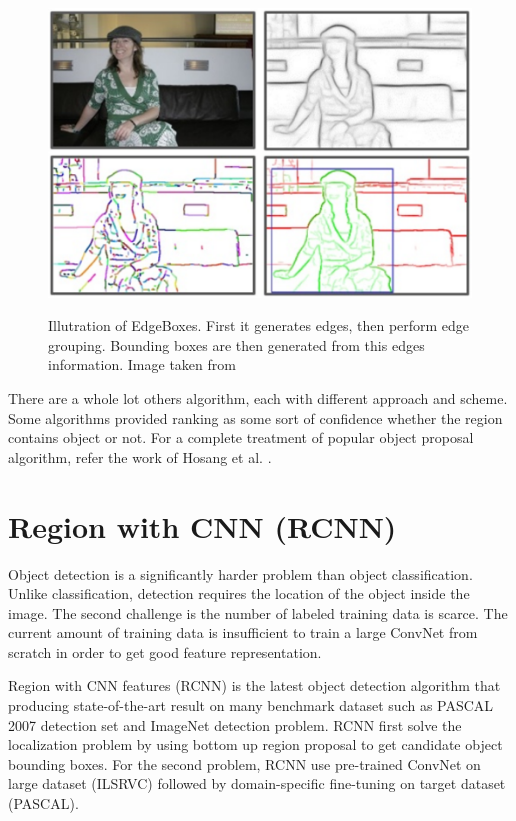 \documentclass[a4paper,11pt]{kth-mag}
\begin{document}
\begin{figure}[h]
\centering
\includegraphics[scale=0.5]{image/edgeboxes.png}
\label{fig:edgeboxes}
\caption{Illutration of EdgeBoxes. First it generates edges, then perform edge grouping. Bounding boxes are then generated from this edges information. Image taken from \cite{zitnick2014edgeboxes}}
\end{figure}

There are a whole lot others algorithm, each with different approach and scheme. Some algorithms provided ranking as some sort of confidence whether the region contains object or not. For a complete treatment of popular object proposal algorithm, refer the work of Hosang et al. \cite{hosang}.

\section{Region with CNN (RCNN)}
Object detection is a significantly harder problem than object classification. Unlike classification, detection requires the location of the object inside the image. The second challenge is the number of labeled training data is scarce. The current amount of training data is insufficient to train a large ConvNet from scratch in order to get good feature representation.

Region with CNN features (RCNN) is the latest object detection algorithm that producing state-of-the-art result on many benchmark dataset such as PASCAL 2007 detection set and ImageNet detection problem. RCNN first solve the localization problem by using bottom up region proposal to get candidate object bounding boxes. For the second problem, RCNN use pre-trained ConvNet on large dataset (ILSRVC) followed by domain-specific fine-tuning on target dataset (PASCAL).
\end{document}
